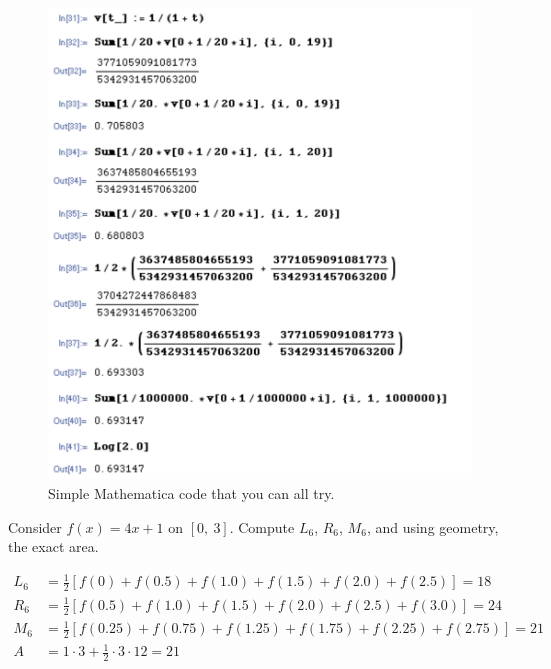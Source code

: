 \documentclass[12pt,addpoints, answers, fleqn]{exam}
\begin{document}
\begin{questions}
\begin{parts}
\begin{solution}
\end{solution}
\begin{figure}[htbp] %
   \centering
   \includegraphics[width=7in]{./graphics/mathematica_code.pdf} 
   \caption{Simple Mathematica code that you can all try.}
   \label{fig:mathematica_code}
\end{figure}
\end{parts}



\question Consider $f\left(x\right) = 4x+1$ on $\left[0, \ 3 \right]$. Compute $L_6$, $R_6$, $M_6$, and using geometry, the exact area.

\begin{solution}
\begin{align*}
L_6 &= \frac{1}{2} \left[ f\left(0\right) + f\left(0.5\right) + f\left(1.0\right) + f\left(1.5\right) + f\left(2.0\right) + f\left(2.5\right)\right] = 18\\
R_6 &= \frac{1}{2} \left[ f\left(0.5\right) + f\left(1.0\right) + f\left(1.5\right) + f\left(2.0\right) + f\left(2.5\right) + f\left(3.0\right)\right] = 24\\
M_6 &= \frac{1}{2} \left[ f\left(0.25\right) + f\left(0.75\right) + f\left(1.25\right) + f\left(1.75\right) + f\left(2.25\right) + f\left(2.75\right)\right] =  21\\
A &= 1 \cdot 3 + \frac{1}{2} \cdot 3 \cdot 12 = 21
\end{align*}
\end{solution}



\end{questions}
\end{document}
